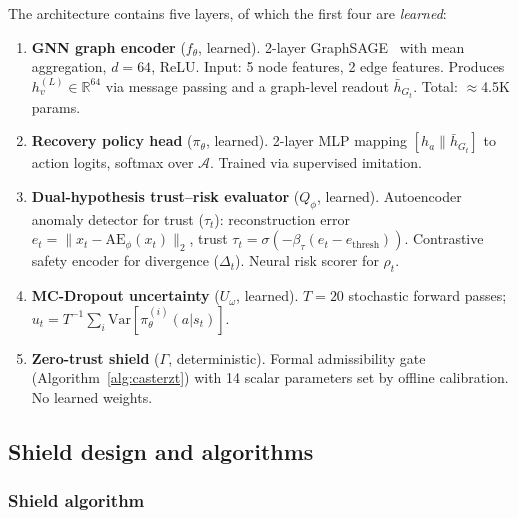 \documentclass[lettersize,journal]{IEEEtran}
\begin{document}
The architecture contains five layers, of which the first four are \emph{learned}:
\begin{enumerate}
    \item \textbf{GNN graph encoder} ($f_\theta$, learned).
    2-layer GraphSAGE~\cite{hamilton2017graphsage} with mean aggregation, $d=64$, ReLU.  Input: 5 node features, 2 edge features.  Produces $h_v^{(L)} \in \mathbb{R}^{64}$ via message passing and a graph-level readout $\bar{h}_{G_t}$.  Total: $\approx$4.5K params.
    \item \textbf{Recovery policy head} ($\pi_\theta$, learned).
    2-layer MLP mapping $[h_a \| \bar{h}_{G_t}]$ to action logits, softmax over $\mathcal{A}$.  Trained via supervised imitation.
    \item \textbf{Dual-hypothesis trust--risk evaluator} ($Q_\phi$, learned).
    Autoencoder anomaly detector for trust ($\tau_t$): reconstruction error $e_t = \|x_t - \mathrm{AE}_\phi(x_t)\|_2$, trust $\tau_t = \sigma(-\beta_\tau(e_t - e_{\mathrm{thresh}}))$.
    Contrastive safety encoder for divergence ($\Delta_t$).
    Neural risk scorer for $\rho_t$.
    \item \textbf{MC-Dropout uncertainty} ($U_\omega$, learned).
    $T=20$ stochastic forward passes; $u_t = T^{-1}\sum_i \mathrm{Var}[\pi_\theta^{(i)}(a|s_t)]$.
    \item \textbf{Zero-trust shield} ($\Gamma$, deterministic).
    Formal admissibility gate (Algorithm~\ref{alg:casterzt}) with 14 scalar parameters set by offline calibration.  No learned weights.
\end{enumerate}


\subsection{Shield design and algorithms}

\subsubsection{Shield algorithm}
\end{document}
